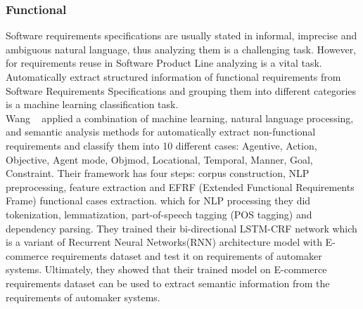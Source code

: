 \subsubsection{Functional}

Software requirements specifications are usually stated in informal, imprecise
and ambiguous natural language, thus analyzing them is a challenging task.
However, for requirements reuse in Software Product Line analyzing is a vital
task. Automatically extract structured information of functional requirements
from Software Requirements Specifications and grouping them into different
categories is a machine learning classification task\cite{7949577}. \\

Wang \etal~\cite{7949577} applied a combination of machine learning, natural
language processing, and semantic analysis methods for automatically extract
non-functional requirements and classify
them into 10 different cases: Agentive, Action, Objective, Agent mode, Objmod, Locational, Temporal, Manner, Goal,
Constraint. Their framework has four steps: corpus construction,  NLP 
preprocessing, feature extraction and  EFRF (Extended Functional Requirements
Frame) functional cases extraction. which for NLP processing they did
tokenization,   lemmatization, part-of-speech tagging (POS  tagging) and
dependency parsing. They trained their bi-directional LSTM-CRF network which is
a variant of Recurrent Neural Networks(RNN) architecture model with E-commerce
requirements dataset and test it on requirements of automaker systems.
Ultimately, they showed that their trained model on E-commerce requirements
dataset can be used to extract semantic information from the requirements of
automaker systems.


